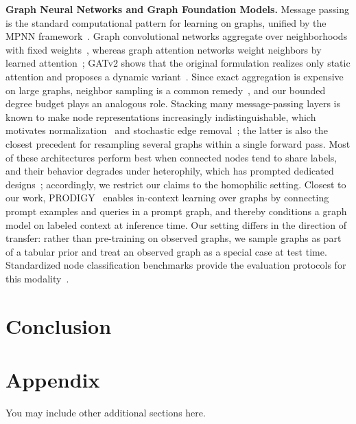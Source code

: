 \documentclass{article} %
\begin{document}
\textbf{Graph Neural Networks and Graph Foundation Models.} Message passing is the standard computational pattern for learning on graphs, unified by the MPNN framework~\citep{gilmer2017neural_msg_passing}. Graph convolutional networks aggregate over neighborhoods with fixed weights~\citep{kipf2017semi}, whereas graph attention networks weight neighbors by learned attention~\citep{velickovic2018graph}; GATv2 shows that the original formulation realizes only static attention and proposes a dynamic variant~\citep{brody2022how_attentive}. Since exact aggregation is expensive on large graphs, neighbor sampling is a common remedy~\citep{hamilton2017inductive}, and our bounded degree budget plays an analogous role. Stacking many message-passing layers is known to make node representations increasingly indistinguishable, which motivates normalization~\citep{zhao2020pairnorm} and stochastic edge removal~\citep{rong2020dropedge}; the latter is also the closest precedent for resampling several graphs within a single forward pass. Most of these architectures perform best when connected nodes tend to share labels, and their behavior degrades under heterophily, which has prompted dedicated designs~\citep{zhu2020beyond, pei2020geomgcn}; accordingly, we restrict our claims to the homophilic setting. Closest to our work, PRODIGY~\citep{huang2023prodigy} enables in-context learning over graphs by connecting prompt examples and queries in a prompt graph, and thereby conditions a graph model on labeled context at inference time. Our setting differs in the direction of transfer: rather than pre-training on observed graphs, we sample graphs as part of a tabular prior and treat an observed graph as a special case at test time. Standardized node classification benchmarks provide the evaluation protocols for this modality~\citep{hu2020open}.

\section{Conclusion}





\appendix
\section{Appendix}
You may include other additional sections here.
\end{document}
